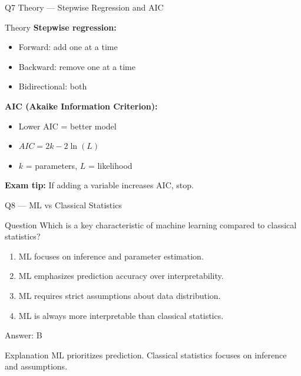 \documentclass[aspectratio=169,8pt]{beamer}
\begin{document}
	\begin{frame}{Q7 Theory --- Stepwise Regression and AIC}
		\begin{block}{Theory}
			\textbf{Stepwise regression:}
			\begin{itemize}
				\item Forward: add one at a time
				\item Backward: remove one at a time
				\item Bidirectional: both
			\end{itemize}
			\textbf{AIC (Akaike Information Criterion):}
			\begin{itemize}
				\item Lower AIC = better model
				\item $AIC = 2k - 2\ln(L)$
				\item $k$ = parameters, $L$ = likelihood
			\end{itemize}
			\textbf{Exam tip:} If adding a variable increases AIC, stop.
		\end{block}
	\end{frame}
	
	\begin{frame}{Q8 --- ML vs Classical Statistics}
		\begin{block}{Question}
			Which is a key characteristic of machine learning compared to classical statistics?
		\end{block}
		\begin{enumerate}[label=\Alph*.]
			\item ML focuses on inference and parameter estimation.
			\item ML emphasizes prediction accuracy over interpretability.
			\item ML requires strict assumptions about data distribution.
			\item ML is always more interpretable than classical statistics.
		\end{enumerate}
		\begin{exampleblock}{Answer: B}
		\end{exampleblock}
		\begin{block}{Explanation}
			ML prioritizes prediction. Classical statistics focuses on inference and assumptions.
		\end{block}
	\end{frame}
	
\end{document}
